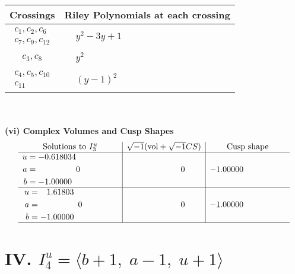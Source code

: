 \documentclass[1p]{elsarticle_modified}
\theoremstyle{definition}
\newcommand{\I}{\sqrt{-1}}
\begin{document}
\begin{tabular}{m{50pt}|m{274pt}}
Crossings & \hspace{64pt}Riley Polynomials at each crossing \\
\hline $$\begin{aligned}c_{1},c_{2},c_{6}\\c_{7},c_{9},c_{12}\end{aligned}$$&$\begin{aligned}
&y^2-3 y+1
\end{aligned}$\\
\hline $$\begin{aligned}c_{3},c_{8}\end{aligned}$$&$\begin{aligned}
&y^2
\end{aligned}$\\
\hline $$\begin{aligned}c_{4},c_{5},c_{10}\\c_{11}\end{aligned}$$&$\begin{aligned}
&(y-1)^2
\end{aligned}$\\
\hline
\end{tabular}\\~\\
\newpage\flushleft \textbf{(vi) Complex Volumes and Cusp Shapes}
$$\begin{array}{c|c|c}  
\text{Solutions to }I^u_{3}& \I (\text{vol} + \sqrt{-1}CS) & \text{Cusp shape}\\
 \hline 
\begin{aligned}
u &= -0.618034\phantom{ +0.000000I} \\
a &= \phantom{-0.000000 } 0 \\
b &= -1.00000\phantom{ +0.000000I}\end{aligned}
 & \phantom{-0.000000 } 0 & -1.00000\phantom{ +0.000000I} \\ \hline\begin{aligned}
u &= \phantom{-}1.61803\phantom{ +0.000000I} \\
a &= \phantom{-0.000000 } 0 \\
b &= -1.00000\phantom{ +0.000000I}\end{aligned}
 & \phantom{-0.000000 } 0 & -1.00000\phantom{ +0.000000I}\\
 \hline 
 \end{array}$$\newpage\newpage\renewcommand{\arraystretch}{1}
\centering \section*{IV. $I^u_{4}= \langle b+1,\;a-1,\;u+1 \rangle$}
\end{document}
